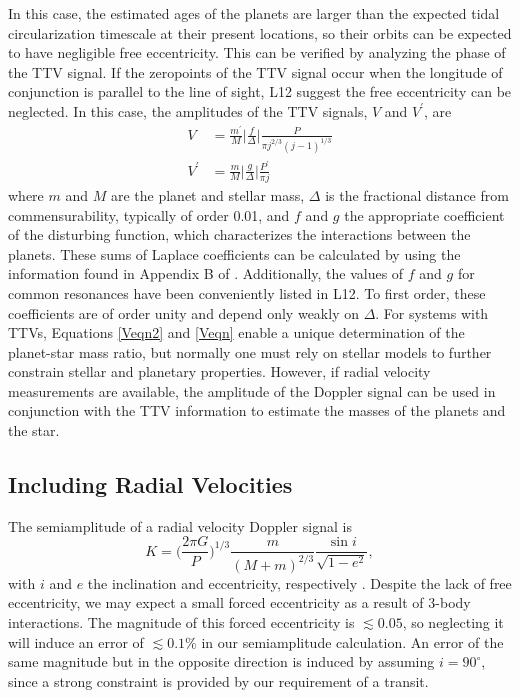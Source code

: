 In this case, the estimated ages of the planets are larger than the expected tidal circularization timescale at their present locations, so their orbits can be expected to have negligible free eccentricity. This can be verified by analyzing the phase of the TTV signal. If the zeropoints of the TTV signal occur when the longitude of conjunction is parallel to the line of sight, L12 suggest the free eccentricity can be neglected. In this case, the amplitudes of the TTV signals, $V$ and $V^\prime$, are
\begin{align}
\label{Veqn2}
V &= \frac{m^\prime}{M} \bigg| \frac{f}{\Delta} \bigg| \frac{P}{\pi j^{2/3} (j-1)^{1/3}} \\
V^\prime &= \frac{m}{M} \bigg| \frac{g}{\Delta} \bigg| \frac{P^\prime}{\pi j} 
\label{Veqn}
\end{align}
where $m$ and $M$ are the planet and stellar mass, $\Delta$ is the fractional distance from commensurability, typically of order 0.01, and $f$ and $g$ the appropriate coefficient of the disturbing function, which characterizes the interactions between the planets. These sums of Laplace coefficients can be calculated by using the information found in Appendix B of \citet{MDSSD}. Additionally, the values of $f$ and $g$ for common resonances have been conveniently listed in L12. To first order, these coefficients are of order unity and depend only weakly on $\Delta$. For systems with TTVs, Equations \ref{Veqn2} and \ref{Veqn} enable a unique determination of the planet-star mass ratio, but normally one must rely on stellar models to further constrain stellar and planetary properties. However, if radial velocity measurements are available, the amplitude of the Doppler signal can be used in conjunction with the TTV information to estimate the masses of the planets and the star.

\subsection{Including Radial Velocities}
The semiamplitude of a radial velocity Doppler signal is
\begin{equation}
K = \bigg( \frac{2\pi G}{P} \bigg) ^{1/3} \frac{m}{(M+m) ^{2/3}} \frac{\sin i}{\sqrt{1-e^2}},
\end{equation}
with $i$ and $e$ the inclination and eccentricity, respectively \citep{Paddock13}. Despite the lack of free eccentricity, we may expect a small forced eccentricity as a result of 3-body interactions. The magnitude of this forced eccentricity is $\lesssim 0.05$, so neglecting it will induce an error of $\lesssim 0.1$\%  in our semiamplitude calculation. An error of the same magnitude but in the opposite direction is induced by assuming $ i = 90 ^\circ$, since a strong constraint is provided by our requirement of a transit.

